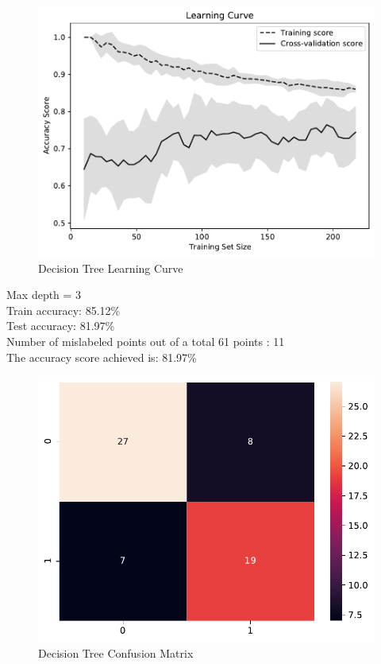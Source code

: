 \documentclass[conference]{IEEEtran}
\begin{document}
\begin{figure}[H]
    \centerline{\includegraphics[width=0.9\linewidth]{images/DecisionTreeClassifier_lc.pdf}}
    \caption{Decision Tree Learning Curve}
    \label{dt_lc}
\end{figure}

\noindent
Max depth = 3
\\Train accuracy: 85.12\%
\\Test accuracy: 81.97\%
\\[\baselineskip]
Number of mislabeled points out of a total 61 points : 11
\\The accuracy score achieved is: 81.97\%

\begin{figure}[H]
    \centerline{\includegraphics[width=0.8\linewidth]{images/decision_tree_cm.pdf}}
    \caption{Decision Tree Confusion Matrix}
    \label{dt_cm}
\end{figure}
\end{document}
